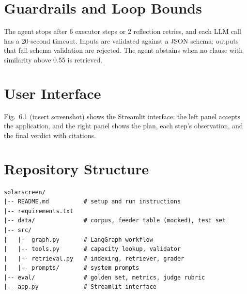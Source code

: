 \documentclass[12pt,a4paper,oneside]{report}
\newif\ifguidance
\newcommand{\guide}[1]{%
  \ifguidance
  \begin{tcolorbox}[enhanced,breakable,colback=guidebg,colframe=bmsblue,
    boxrule=0.6pt,arc=2pt,left=6pt,right=6pt,top=4pt,bottom=4pt,
    fonttitle=\bfseries\small,title={What to write here},
    before upper={\small\setstretch{1.1}}]
  #1
  \end{tcolorbox}
  \fi}
\newcommand{\dodont}[2]{%
  \ifguidance
  \begin{tcolorbox}[enhanced,breakable,sidebyside,sidebyside align=top seam,
    colback=dobg,colbacklower=dontbg,colframe=gray!60,boxrule=0.5pt,arc=2pt,
    lefthand ratio=0.5,left=5pt,right=5pt,top=4pt,bottom=4pt,
    fontupper=\small\setstretch{1.05},fontlower=\small\setstretch{1.05}]
  \textbf{\textcolor{ForestGreen}{\checkmark\ Do}}
  \begin{itemize}[leftmargin=12pt,itemsep=1pt,topsep=2pt]#1\end{itemize}
  \tcblower
  \textbf{\textcolor{BrickRed}{$\times$ Don't}}
  \begin{itemize}[leftmargin=12pt,itemsep=1pt,topsep=2pt]#2\end{itemize}
  \end{tcolorbox}
  \fi}
\newenvironment{sample}
  {\par\noindent{\footnotesize\bfseries\textcolor{BrickRed}{[SAMPLE --- replace with your own content]}}\par\color{samplecol}}
  {\par\medskip}
\begin{document}
\section{Guardrails and Loop Bounds}
\guide{List every guardrail: maximum steps, maximum retries, timeout, input validation, output schema
validation, and refusal or abstention rules.}
\dodont{\item Give the numeric value of every bound.
}
{\item Do not allow any unbounded loop on a paid API.
}

\begin{sample}
The agent stops after 6 executor steps or 2 reflection retries, and each LLM call has a 20-second
timeout. Inputs are validated against a JSON schema; outputs that fail schema validation are rejected.
The agent abstains when no clause with similarity above 0.55 is retrieved.
\end{sample}


\section{User Interface}
\guide{One or two screenshots of the interface with a short description. Keep this brief; the interface
is not the focus of the course.}
\dodont{\item Show the screen where the agent's reasoning is visible.
}
{\item Do not spend more than one page on the interface.
}

\begin{sample}
Fig.~6.1 (insert screenshot) shows the Streamlit interface: the left panel accepts the application,
and the right panel shows the plan, each step's observation, and the final verdict with citations.
\end{sample}


\section{Repository Structure}
\guide{Show the folder layout and describe the purpose of each main file.}
\dodont{\item Keep the repository clean and documented.
}
{\item Do not commit API keys, virtual environments or large data files.
}
\begin{sample}
\begin{lstlisting}[language={},numbers=none,caption={Repository layout (sample)}]
solarscreen/
|-- README.md          # setup and run instructions
|-- requirements.txt
|-- data/              # corpus, feeder table (mocked), test set
|-- src/
|   |-- graph.py       # LangGraph workflow
|   |-- tools.py       # capacity lookup, validator
|   |-- retrieval.py   # indexing, retriever, grader
|   |-- prompts/       # system prompts
|-- eval/              # golden set, metrics, judge rubric
|-- app.py             # Streamlit interface
\end{lstlisting}
\end{sample}
\end{document}
